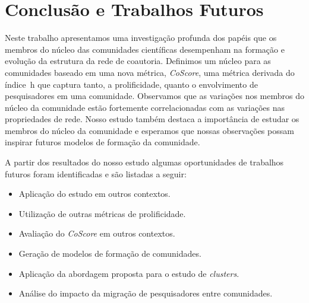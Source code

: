\documentclass[12pt]{article}
\begin{document}
\section{Conclusão e Trabalhos Futuros}

Neste trabalho apresentamos uma investigação profunda dos papéis que os membros do núcleo das 
comunidades científicas desempenham na formação e evolução da estrutura da rede de coautoria. 
Definimos um núcleo para as comunidades 
baseado em uma nova métrica, \textit{CoScore}, uma métrica derivada do índice~h que captura 
tanto, a prolificidade, quanto o envolvimento de pesquisadores em uma comunidade. 
Observamos que as variações nos membros do núcleo da comunidade estão fortemente correlacionadas 
com as variações nas propriedades de rede. Nosso estudo também destaca a importância de estudar os membros 
do núcleo da comunidade e esperamos que nossas observações possam inspirar futuros modelos de formação da comunidade.

A partir dos resultados do nosso estudo algumas oportunidades de trabalhos futuros foram identificadas e são listadas a seguir:

\begin{itemize}
  \item Aplicação do estudo em outros contextos.
  \item Utilização de outras métricas de prolificidade.
  \item Avaliação do \textit{CoScore} em outros contextos.
  \item Geração de modelos de formação de comunidades.
  \item Aplicação da abordagem proposta para o estudo de \textit{clusters}.
  \item Análise do impacto da migração de pesquisadores entre comunidades.
\end{itemize}



\end{document}
